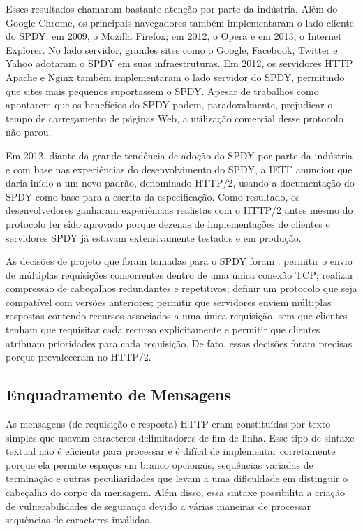 Esses resultados chamaram bastante atenção por parte da indústria. Além do Google Chrome, os principais navegadores também implementaram o lado cliente do SPDY: em 2009, o Mozilla Firefox; em 2012, o Opera e em 2013, o Internet Explorer. No lado servidor, grandes sites como o Google, Facebook, Twitter e Yahoo adotaram o SPDY em suas infraestruturas. Em 2012, os servidores HTTP Apache e Nginx também implementaram o lado servidor do SPDY, permitindo que sites mais pequenos suportassem o SPDY. Apesar de trabalhos como \cite{Wang:2014:SS:2616448.2616484} apontarem que os benefícios do SPDY podem, paradoxalmente, prejudicar o tempo de carregamento de páginas Web, a utilização comercial desse protocolo não parou.

Em 2012, diante da grande tendência de adoção do SPDY por parte da indústria e com base nas experiências do desenvolvimento do SPDY, a IETF anunciou que daria início a um novo padrão, denominado HTTP/2, usando a documentação do SPDY como base para a escrita da especificação. Como resultado, os desenvolvedores ganharam experiências realistas com o HTTP/2 antes mesmo do protocolo ter sido aprovado porque dezenas de implementações de clientes e servidores SPDY já estavam extensivamente testados e em produção.

As decisões de projeto que foram tomadas para o SPDY foram \cite{Belshe2009SPDY}: permitir o envio de múltiplas requisições concorrentes dentro de uma única conexão TCP; realizar compressão de cabeçalhos redundantes e repetitivos; definir um protocolo que seja compatível com versões anteriores; permitir que servidores enviem múltiplas respostas contendo recursos associados a uma única requisição, sem que clientes tenham que requisitar cada recurso explicitamente e permitir que clientes atribuam prioridades para cada requisição. De fato, essas decisões foram precisas porque prevaleceram no HTTP/2.

\subsection{Enquadramento de Mensagens}
\label{subsec:framing}

As mensagens (de requisição e resposta) HTTP eram constituídas por texto simples que usavam caracteres delimitadores de fim de linha. Esse tipo de sintaxe textual não é eficiente para processar e é difícil de implementar corretamente porque ela permite espaços em branco opcionais, sequências variadas de terminação e outras peculiaridades que levam a uma dificuldade em distinguir o cabeçalho do corpo da mensagem. Além disso, essa sintaxe possibilita a criação de vulnerabilidades de segurança devido a várias maneiras de processar sequências de caracteres inválidas.

